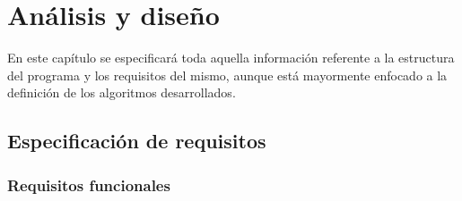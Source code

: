 
\chapter{Análisis y diseño}

En este capítulo se especificará toda aquella información referente a la estructura del programa y los requisitos del mismo, aunque está mayormente enfocado a la definición de los algoritmos desarrollados.

\section{Especificación de requisitos}

	\subsection*{Requisitos funcionales}
